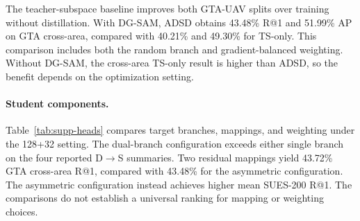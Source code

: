 \par\medskip\noindent\begin{minipage}{\columnwidth}
\captionsetup{type=table}
\centering
\caption{Stage II SUES-200 S$\rightarrow$D results by flight height. Cells report R@1/AP (\%).}
\label{tab:supp-student-sues-s2d}
{\footnotesize\setlength{\tabcolsep}{2pt}\renewcommand{\arraystretch}{1.08}
}
\end{minipage}\par\medskip

The teacher-subspace baseline improves both GTA-UAV splits over training without distillation. With DG-SAM, ADSD obtains 43.48\% R@1 and 51.99\% AP on GTA cross-area, compared with 40.21\% and 49.30\% for TS-only. This comparison includes both the random branch and gradient-balanced weighting. Without DG-SAM, the cross-area TS-only result is higher than ADSD, so the benefit depends on the optimization setting.

\paragraph{Student components.}
Table~\ref{tab:supp-heads} compares target branches, mappings, and weighting under the 128+32 setting. The dual-branch configuration exceeds either single branch on the four reported D$\rightarrow$S summaries. Two residual mappings yield 43.72\% GTA cross-area R@1, compared with 43.48\% for the asymmetric configuration. The asymmetric configuration instead achieves higher mean SUES-200 R@1. The comparisons do not establish a universal ranking for mapping or weighting choices.

